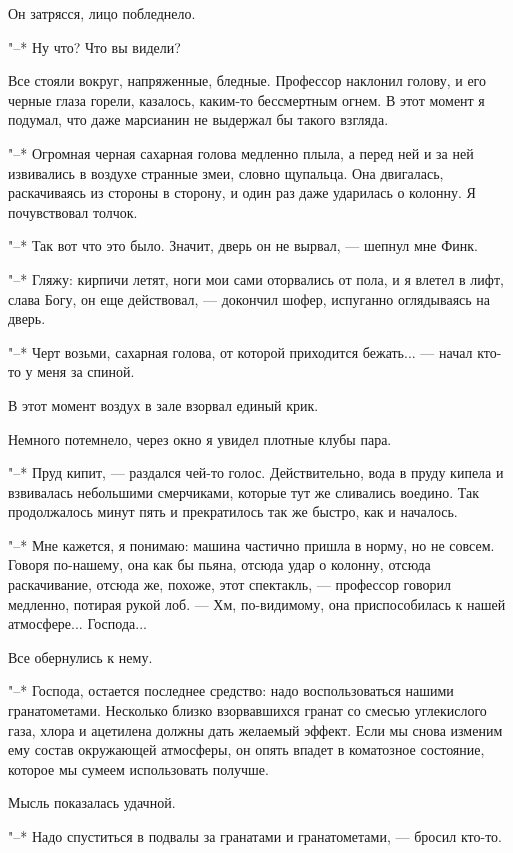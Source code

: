Он затрясся, лицо побледнело.

"--* Ну что? Что вы видели?

Все стояли вокруг, напряженные, бледные. Профессор наклонил  голову,  и
его черные глаза горели, казалось,  каким-то  бессмертным  огнем.  В  этот
момент я подумал, что даже марсианин не выдержал бы такого взгляда.

"--* Огромная черная сахарная голова медленно плыла, а перед ней и за  ней
извивались в  воздухе  странные  змеи,  словно  щупальца.  Она  двигалась,
раскачиваясь из стороны в сторону, и один раз даже ударилась о колонну.  Я
почувствовал толчок.

"--* Так вот что это было. Значит, дверь он не вырвал, --- шепнул мне Финк.

"--* Гляжу: кирпичи летят, ноги мои сами оторвались от пола, и я влетел  в
лифт,  слава  Богу,  он  еще  действовал,  ---  докончил  шофер,   испуганно
оглядываясь на дверь.

"--* Черт возьми, сахарная голова, от которой приходится бежать... --- начал
кто-то у меня за спиной.

В этот момент воздух в зале взорвал единый крик.

Немного потемнело, через окно я увидел плотные клубы пара.

"--* Пруд кипит, --- раздался чей-то  голос.  Действительно,  вода  в  пруду
кипела и  взвивалась  небольшими  смерчиками,  которые  тут  же  сливались
воедино. Так продолжалось минут пять и прекратилось так же быстро,  как  и
началось.

"--* Мне кажется, я понимаю: машина частично пришла в норму, но не совсем.
Говоря по-нашему,  она  как  бы  пьяна,  отсюда  удар  о  колонну,  отсюда
раскачивание, отсюда же,  похоже,  этот  спектакль,  ---  профессор  говорил
медленно, потирая рукой лоб. --- Хм, по-видимому, она приспособилась к нашей
атмосфере... Господа...

Все обернулись к нему.

"--* Господа, остается последнее  средство:  надо  воспользоваться  нашими
гранатометами. Несколько близко взорвавшихся гранат со смесью  углекислого
газа, хлора и ацетилена должны дать желаемый эффект. Если мы снова изменим
ему состав окружающей атмосферы, он опять впадет в  коматозное  состояние,
которое мы сумеем использовать получше.

Мысль показалась удачной.

"--* Надо спуститься в подвалы за  гранатами  и  гранатометами,  ---  бросил
кто-то.

